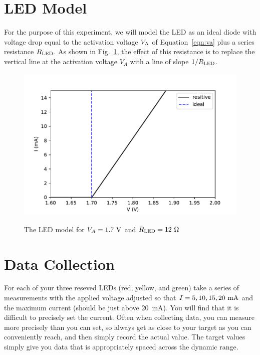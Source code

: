 \documentclass[12pt]{article}
\begin{document}
\section{LED Model}

For the purpose of this experiment, we will model the LED as an ideal
diode with voltage drop equal to the activation voltage $V_{\rm A}$ of
Equation~\ref{eqn:va} plus a series resistance $R_{\rm LED}$.  As
shown in Fig.~\ref{fig:ledmodel}, the effect of this resistance is to
replace the vertical line at the activation voltage $V_A$ with a line
of slope $1/R_{\rm LED}$.

\begin{figure}[htbp]
\begin{center}
\includegraphics[height=0.3\textheight]{figs/model.pdf} \\
\end{center}
\caption{The LED model for $V_A=1.7~\rm V$ and $R_{\rm LED}=12~\Omega$}
\label{fig:ledmodel}
\end{figure}

\section{Data Collection}

For each of your three reseved LEDs (red, yellow, and green) take a
series of measurements with the applied voltage adjusted so that
$I=5,10,15,20~\rm mA$ and the maximum current (should be just above
20~\rm mA).  You will find that it is difficult to precisely set the
current.  Often when collecting data, you can measure more precisely
than you can set, so always get as close to your target as you can
conveniently reach, and then simply record the actual value.  The
target values simply give you data that is appropriately spaced across
the dynamic range.
\end{document}
